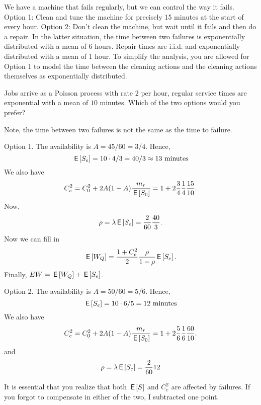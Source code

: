 \begin{exercise}[201706]
  We have a machine that fails regularly, but we can control the way it fails.
  Option 1: Clean and tune the machine for precisely 15 minutes at the start of every hour.
  Option 2: Don't clean the machine, but wait until it fails and then do a repair.
  In the latter situation, the time between two failures is exponentially distributed with a mean of 6 hours.
  Repair times are i.i.d.
  and exponentially distributed with a mean of 1 hour.
  To simplify the analysis, you are allowed for Option 1 to model the time between the cleaning actions and the cleaning actions themselves as exponentially distributed.

Jobs arrive as a Poisson process with rate $2$ per hour, regular service times are exponential with a mean of $10$ minutes. Which of the two options would you prefer?
\begin{solution}
Note, the time between two failures is not the same as the time to failure.


Option 1. The availability is $A=45/60=3/4$. Hence, 
\begin{equation*}
\,\mathsf{E}\left[S_e\right] = 10\cdot 4/3 = 40/3 \approx 13\text{ minutes}
\end{equation*}
We also have
\begin{equation*}
   C_e^2 = C_0^2 + 2A(1-A)\frac{m_r}{\,\mathsf{E}\left[S_0\right]} = 1 + 2\frac{3}{4}\frac1{4}\frac{15}{10}.
 \end{equation*}
Now,
\begin{equation*}
  \rho = \lambda \,\mathsf{E}\left[S_e\right] = \frac{2}{60}\frac{40}3.
\end{equation*}
Now we can fill in 
\begin{equation*}
  \,\mathsf{E}\left[W_Q\right] = \frac{1 + C_e^2}2 \frac{\rho}{1-\rho} \,\mathsf{E}\left[S_e\right].
\end{equation*}
Finally, $E W = \,\mathsf{E}\left[W_Q\right] + \,\mathsf{E}\left[S_e\right]$.


Option 2. The availability is $A=50/60=5/6$. Hence, 
\begin{equation*}
\,\mathsf{E}\left[S_e\right] = 10\cdot 6/5 = 12\text{ minutes}
\end{equation*}
We also have
\begin{equation*}
   C_e^2 = C_0^2 + 2A(1-A)\frac{m_r}{\,\mathsf{E}\left[S_0\right]} = 1 + 2\frac{5}{6}\frac1{6}\frac{60}{10}.
 \end{equation*}
and
\begin{equation*}
  \rho = \lambda \,\mathsf{E}\left[S_e\right] = \frac{2}{60}12
\end{equation*}

It is essential that you realize that both $\,\mathsf{E}\left[S\right]$ and $C_e^2$ are affected by failures. If you forgot to compensate in either of the two, I subtracted one point. 
\end{solution}
\end{exercise}


